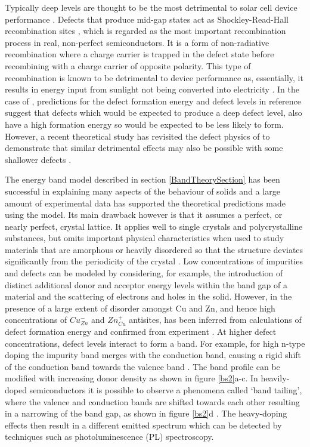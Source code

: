 \documentclass[11pt, twoside]{report}
\begin{document}
Typically deep levels are thought to be the most detrimental to solar cell device performance \cite{Stoneham_killer_defects}. 
Defects that produce mid-gap states act as Shockley-Read-Hall recombination sites \cite{SRH}, which is regarded as the most important recombination process in real, non-perfect semiconductors. It is a form of non-radiative recombination where a charge carrier is trapped in the defect state before recombining with a charge carrier of opposite polarity. This type of recombination is known to be detrimental to device performance as, essentially, it results in energy input from sunlight not being converted into electricity \cite{Nelson4}.
In the case of {\CZTS}, predictions for the defect formation energy and defect levels in reference  suggest that defects which would be expected to produce a deep defect level, also have a high formation energy so would be expected to be less likely to form.
However, a recent theoretical study has revisited the defect physics of {\CZTS} to demonstrate that similar detrimental effects may also be possible with some shallower defects \cite{Sunghyun_killer_defects}.

The energy band model described in section \ref{BandTheorySection} has been successful in explaining many aspects of the behaviour of solids and a large amount of experimental data has supported the theoretical predictions made using the model. Its main drawback however is that it assumes a perfect, or nearly perfect, crystal lattice. It applies well to single crystals and polycrystalline substances, but omits important physical characteristics when used to study materials that are amorphous or heavily disordered so that the structure deviates significantly from the periodicity of the crystal \cite{small_semiconductor1}.
Low concentrations of impurities and defects can be modeled by considering, for example, the introduction of distinct additional donor and acceptor energy levels within the band gap of a material and the scattering of electrons and holes in the solid. However, in {\CZTS} the presence of a large extent of disorder amongst Cu and Zn, and hence high concentrations of $Cu_{Zn}^{-}$ and $Zn_{Cu}^{+}$ antisites, has been inferred from calculations of defect formation energy \cite{defects_Chen} and confirmed from experiment \cite{Schorr, CZTS_Xray, CZTS_TEM}. 
At higher defect concentrations, defect levels interact to form a band. For example, for high n-type doping the impurity band merges with the conduction band, causing a rigid shift of the conduction band towards the valence band \cite{Pankove}. The band profile can be modified with increasing donor density as shown in figure \ref{bs2}a-c. 
In heavily-doped semiconductors it is possible to observe a phenomena called `band tailing', where the valence and conduction bands are shifted towards each other resulting in a narrowing of the band gap, as shown in figure \ref{bs2}d \cite{Pankove}. The heavy-doping effects then result in a different emitted spectrum which can be detected by techniques such as photoluminescence (PL) spectroscopy. 
\end{document}
